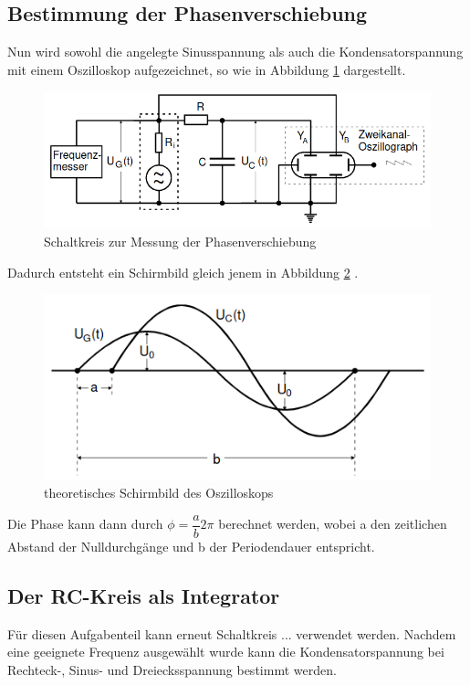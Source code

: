 \subsection{Bestimmung der Phasenverschiebung}
    Nun wird sowohl die angelegte Sinusspannung als auch die Kondensatorspannung mit einem
    Oszilloskop aufgezeichnet, so wie in Abbildung \ref{fig:schalt1} dargestellt. 
    \begin{figure}
        \centering
        \includegraphics{schalt1.png}
        \caption{Schaltkreis zur Messung der Phasenverschiebung}
        \label{fig:schalt1}
    \end{figure}
    Dadurch entsteht ein 
    Schirmbild gleich jenem in Abbildung \ref{fig:sinus} . 
    \begin{figure}
        \centering
        \includegraphics{sinus.png}
        \caption{theoretisches Schirmbild des Oszilloskops}
        \label{fig:sinus}
    \end{figure}
    Die Phase kann dann durch $\phi = \dfrac{a}{b} 2\pi$
    berechnet werden, wobei a den zeitlichen Abstand der Nulldurchgänge und b der Periodendauer
    entspricht.

\subsection{Der RC-Kreis als Integrator}
    Für diesen Aufgabenteil kann erneut Schaltkreis ... verwendet werden. Nachdem  eine geeignete
    Frequenz ausgewählt wurde kann die Kondensatorspannung bei Rechteck-, Sinus- und Dreiecksspannung
    bestimmt werden.